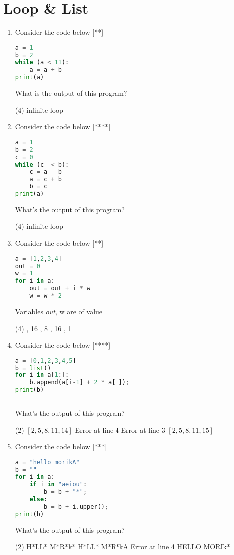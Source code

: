 \documentclass[11pt]{amsart}
\begin{document}
\section{Loop \& List}
\begin{enumerate}
\item Consider the code below [**]
\begin{lstlisting}[language=Python]
a = 1
b = 2
while (a < 11):
	a = a + b
print(a)
\end{lstlisting}
What is the output of this program?
	\begin{tasks}(4)
		\task infinite loop
	\end{tasks}

\item Consider the code below [****]
\begin{lstlisting}[language=Python]
a = 1
b = 2
c = 0
while (c  < b):
	c = a - b
	a = c + b
	b = c
print(a)
\end{lstlisting}
What's the output of this program?
\begin{tasks}(4)
	\task infinite loop
\end{tasks}

\item Consider the code below [**]
\begin{lstlisting}[language=Python]
a = [1,2,3,4]
out = 0
w = 1
for i in a:
	out = out + i * w
	w = w * 2
\end{lstlisting}
Variables \textit{out}, w are of value
\begin{tasks}(4)
	, 16
	, 8
	, 16
	, 1
\end{tasks}


\item Consider the code below [****]
\begin{lstlisting}[language=Python]
a = [0,1,2,3,4,5]
b = list()
for i in a[1:]:
	b.append(a[i-1] + 2 * a[i]);
print(b)
	
\end{lstlisting}
What's the output of this program?
\begin{tasks}(2)
	\task $[2, 5, 8, 11, 14]$
	\task Error at line 4
	\task Error at line 3
	\task $[2, 5, 8, 11, 15]$
\end{tasks}

\item Consider the code below [***]
\begin{lstlisting}[language=Python]
a = "hello morikA"
b = ""
for i in a:
	if i in "aeiou":
		b = b + "*";
	else:
		b = b + i.upper();	
print(b)
\end{lstlisting}
What's the output of this program?
\begin{tasks}(2)
	\task H*LL* M*R*k*
	\task	H*LL* M*R*kA
	\task Error at line 4
	\task HELLO MORIk*
\end{tasks}







\end{enumerate}
\end{document}
